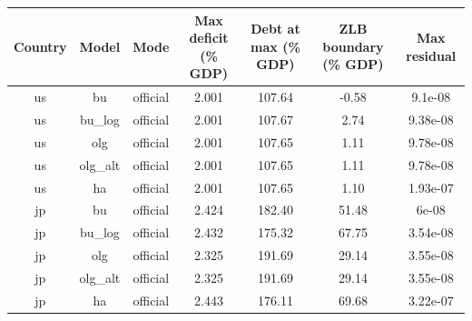 \begin{table}[!ht]
\setlength\tabcolsep{0.425em}
\setlength\aboverulesep{0pt}
\setlength\belowrulesep{0.2em}
\centering
\begin{threeparttable}
\begin{tabular}{ccccccc}
\toprule[0.1em]
Country & Model & Mode & Max deficit (\% GDP) & Debt at max (\% GDP) & ZLB boundary (\% GDP) & Max residual \\[0.2em]
\midrule[0.075em]
us & bu & official & 2.001 & 107.64 & -0.58 & 9.1e-08 \\[0.2em]
us & bu\_log & official & 2.001 & 107.67 & 2.74 & 9.38e-08 \\[0.2em]
us & olg & official & 2.001 & 107.65 & 1.11 & 9.78e-08 \\[0.2em]
us & olg\_alt & official & 2.001 & 107.65 & 1.11 & 9.78e-08 \\[0.2em]
us & ha & official & 2.001 & 107.65 & 1.10 & 1.93e-07 \\[0.2em]
jp & bu & official & 2.424 & 182.40 & 51.48 & 6e-08 \\[0.2em]
jp & bu\_log & official & 2.432 & 175.32 & 67.75 & 3.54e-08 \\[0.2em]
jp & olg & official & 2.325 & 191.69 & 29.14 & 3.55e-08 \\[0.2em]
jp & olg\_alt & official & 2.325 & 191.69 & 29.14 & 3.55e-08 \\[0.2em]
jp & ha & official & 2.443 & 176.11 & 69.68 & 3.22e-07 \\[0.2em]
\bottomrule[0.1em]
\end{tabular}
\end{threeparttable}
\end{table}
